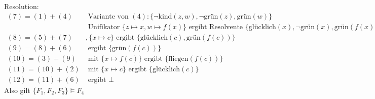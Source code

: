 \begin{enumerate}
Resolution: 
\begin{align*}
(7) = (1)+(4) & \text{ Variante von } (4): \{\neg \text{kind}(z,w), \neg\text{grün}(z),\text{grün}(w)\} \\
& \text{ Unifikator } \{z \mapsto x, w \mapsto f(x)\} \text{ ergibt Resolvente } \{\text{glücklich}(x),\neg\text{grün}(x),\text{grün}(f(x))\} \\
(8) = (5)+(7) &,\{x \mapsto c\} \text{ ergibt } \{\text{glücklich}(c),\text{grün}(f(c))\} \\
(9) = (8)+(6) & \text{ ergibt } \{\text{grün}(f(c))\} \\
(10) = (3)+(9) & \text{ mit } \{x \mapsto f(c)\} \text{ ergibt } \{\text{fliegen}(f(c))\} \\
(11) = (10)+(2) & \text{ mit } \{x \mapsto c\} \text{ ergibt } \{\text{glücklich}(c)\} \\
(12) = (11)+(6) & \text{ ergibt } \bot
\end{align*}
Also gilt $\{F_1, F_2, F_3\} \models F_4$
\end{enumerate}
